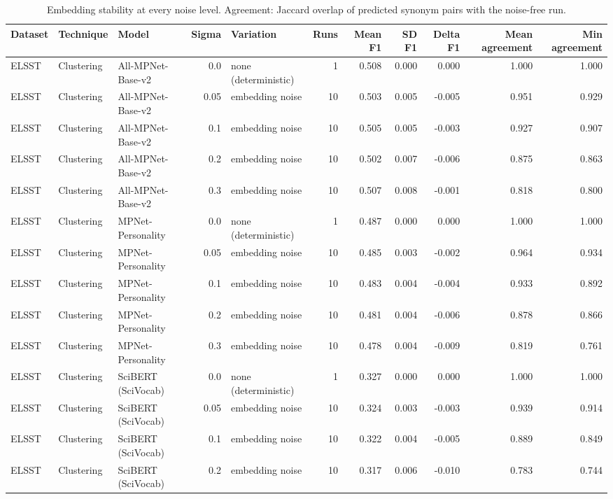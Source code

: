 \begin{table}[ht]
\centering
\small
\caption{Embedding stability at every noise level. Agreement: Jaccard overlap of predicted synonym pairs with the noise-free run.}
\label{tab:S3_stability_all_levels}
\begin{tabular}{lllrlrrrrrr}
\toprule
Dataset & Technique & Model & Sigma & Variation & Runs & Mean F1 & SD F1 & Delta F1 & Mean agreement & Min agreement \\
\midrule
ELSST & Clustering & All-MPNet-Base-v2 & 0.0 & none (deterministic) & 1 & 0.508 & 0.000 & 0.000 & 1.000 & 1.000 \\
ELSST & Clustering & All-MPNet-Base-v2 & 0.05 & embedding noise & 10 & 0.503 & 0.005 & -0.005 & 0.951 & 0.929 \\
ELSST & Clustering & All-MPNet-Base-v2 & 0.1 & embedding noise & 10 & 0.505 & 0.005 & -0.003 & 0.927 & 0.907 \\
ELSST & Clustering & All-MPNet-Base-v2 & 0.2 & embedding noise & 10 & 0.502 & 0.007 & -0.006 & 0.875 & 0.863 \\
ELSST & Clustering & All-MPNet-Base-v2 & 0.3 & embedding noise & 10 & 0.507 & 0.008 & -0.001 & 0.818 & 0.800 \\
ELSST & Clustering & MPNet-Personality & 0.0 & none (deterministic) & 1 & 0.487 & 0.000 & 0.000 & 1.000 & 1.000 \\
ELSST & Clustering & MPNet-Personality & 0.05 & embedding noise & 10 & 0.485 & 0.003 & -0.002 & 0.964 & 0.934 \\
ELSST & Clustering & MPNet-Personality & 0.1 & embedding noise & 10 & 0.483 & 0.004 & -0.004 & 0.933 & 0.892 \\
ELSST & Clustering & MPNet-Personality & 0.2 & embedding noise & 10 & 0.481 & 0.004 & -0.006 & 0.878 & 0.866 \\
ELSST & Clustering & MPNet-Personality & 0.3 & embedding noise & 10 & 0.478 & 0.004 & -0.009 & 0.819 & 0.761 \\
ELSST & Clustering & SciBERT (SciVocab) & 0.0 & none (deterministic) & 1 & 0.327 & 0.000 & 0.000 & 1.000 & 1.000 \\
ELSST & Clustering & SciBERT (SciVocab) & 0.05 & embedding noise & 10 & 0.324 & 0.003 & -0.003 & 0.939 & 0.914 \\
ELSST & Clustering & SciBERT (SciVocab) & 0.1 & embedding noise & 10 & 0.322 & 0.004 & -0.005 & 0.889 & 0.849 \\
ELSST & Clustering & SciBERT (SciVocab) & 0.2 & embedding noise & 10 & 0.317 & 0.006 & -0.010 & 0.783 & 0.744 \\

\end{tabular}
\end{table}
